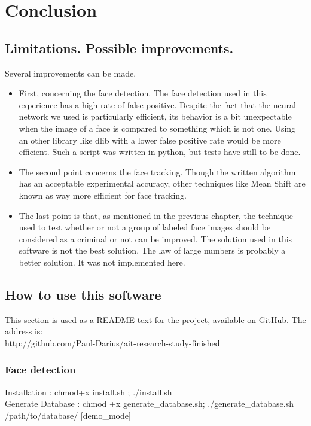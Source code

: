 \setlength{\footskip}{8mm}

\chapter{Conclusion}
\label{ch:conclusion}


\section{Limitations. Possible improvements.}
Several improvements can be made.
\begin{itemize}
\item First, concerning the face detection. The face detection used in this experience has a high rate of false positive. Despite the fact that the neural network we used is particularly efficient, its behavior is a bit unexpectable when the image of a face is compared to something which is not one. Using an other library like dlib with a lower false positive rate would be more efficient. Such a script was written in python, but tests have still to be done.
\item The second point concerns the face tracking. Though the written algorithm has an acceptable experimental accuracy, other techniques like Mean Shift are known as way more efficient for face tracking.
\item The last point is that, as mentioned in the previous chapter, the technique used to test whether or not a group of labeled face images should be considered as a criminal or not can be improved. The solution used in this software is not the best solution. The law of large numbers is probably a better solution. It was not implemented here.
\end{itemize}

\section{How to use this software}
This section is used as a README text for the project, available on GitHub. The address is:\\ http://github.com/Paul-Darius/ait-research-study-finished\newpage
\FloatBarrier

\subsection{Face detection}

Installation : chmod+x install.sh ; ./install.sh\\
Generate Database : chmod +x generate\_database.sh; ./generate\_database.sh /path/to/database/ [demo\_mode]\\


